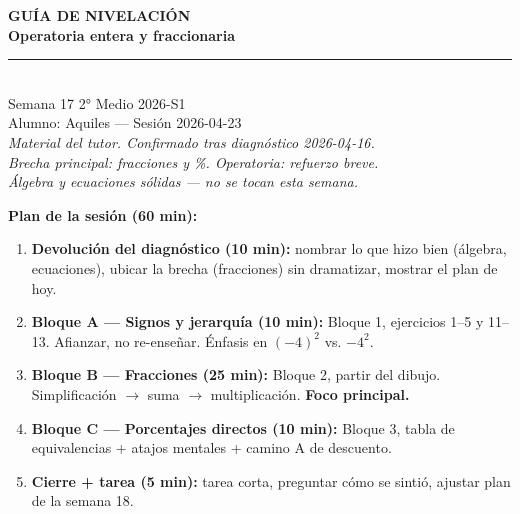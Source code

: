 \documentclass[11pt,a4paper]{article}
\begin{document}
\thispagestyle{empty}
\vspace*{2.5cm}
\begin{center}
  {\Huge\bfseries\color{azulprincipal} GUÍA DE NIVELACIÓN}\\[8pt]
  {\LARGE\bfseries\color{azuloscuro} Operatoria entera y fraccionaria}\\[15pt]
  {\color{azulprincipal}\rule{8cm}{2pt}}\\[15pt]
  {\Large Semana 17 \textbar{} 2° Medio \textbar{} 2026-S1}\\[8pt]
  {\large Alumno: Aquiles --- Sesión 2026-04-23}\\[25pt]
  {\itshape\color{gray}
  Material del tutor. Confirmado tras diagnóstico 2026-04-16.\\[4pt]
  Brecha principal: fracciones y \%. Operatoria: refuerzo breve.\\[4pt]
  Álgebra y ecuaciones sólidas --- no se tocan esta semana.}
\end{center}

\vspace{1cm}
\begin{tcolorbox}[recuerda]
\textbf{Plan de la sesión (60 min):}
\begin{enumerate}[nosep]
  \item \textbf{Devolución del diagnóstico (10 min):} nombrar lo que hizo bien (álgebra, ecuaciones), ubicar la brecha (fracciones) sin dramatizar, mostrar el plan de hoy.
  \item \textbf{Bloque A --- Signos y jerarquía (10 min):} Bloque 1, ejercicios 1--5 y 11--13. Afianzar, no re-enseñar. Énfasis en $(-4)^2$ vs. $-4^2$.
  \item \textbf{Bloque B --- Fracciones (25 min):} Bloque 2, partir del dibujo. Simplificación $\to$ suma $\to$ multiplicación. \textbf{Foco principal.}
  \item \textbf{Bloque C --- Porcentajes directos (10 min):} Bloque 3, tabla de equivalencias + atajos mentales + camino A de descuento.
  \item \textbf{Cierre + tarea (5 min):} tarea corta, preguntar cómo se sintió, ajustar plan de la semana 18.
\end{enumerate}
\end{tcolorbox}

\newpage

\end{document}
